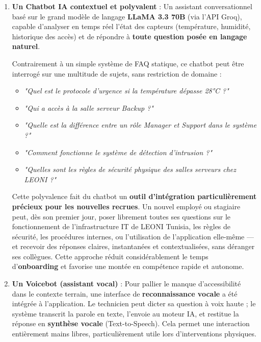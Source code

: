 \documentclass[12pt,a4paper]{report}
\begin{document}
\begin{enumerate}
    \item \textbf{Un Chatbot IA contextuel et polyvalent} : Un assistant conversationnel basé sur le grand modèle de langage \textbf{LLaMA 3.3 70B} (via l'API Groq), capable d'analyser en temps réel l'état des capteurs (température, humidité, historique des accès) et de répondre à \textbf{toute question posée en langage naturel}.

    Contrairement à un simple système de FAQ statique, ce chatbot peut être interrogé sur une multitude de sujets, sans restriction de domaine :
    \begin{itemize}
        \item \textit{"Quel est le protocole d'urgence si la température dépasse 28°C ?"}
        \item \textit{"Qui a accès à la salle serveur Backup ?"}
        \item \textit{"Quelle est la différence entre un rôle Manager et Support dans le système ?"}
        \item \textit{"Comment fonctionne le système de détection d'intrusion ?"}
        \item \textit{"Quelles sont les règles de sécurité physique des salles serveurs chez LEONI ?"}
    \end{itemize}

    Cette polyvalence fait du chatbot un \textbf{outil d'intégration particulièrement précieux pour les nouvelles recrues}. Un nouvel employé ou stagiaire peut, dès son premier jour, poser librement toutes ses questions sur le fonctionnement de l'infrastructure IT de LEONI Tunisia, les règles de sécurité, les procédures internes, ou l'utilisation de l'application elle-même --- et recevoir des réponses claires, instantanées et contextualisées, sans déranger ses collègues. Cette approche réduit considérablement le temps d'\textbf{onboarding} et favorise une montée en compétence rapide et autonome.

    \item \textbf{Un Voicebot (assistant vocal)} : Pour pallier le manque d'accessibilité dans le contexte terrain, une interface de \textbf{reconnaissance vocale} a été intégrée à l'application. Le technicien peut dicter sa question à voix haute ; le système transcrit la parole en texte, l'envoie au moteur IA, et restitue la réponse en \textbf{synthèse vocale} (Text-to-Speech). Cela permet une interaction entièrement mains libres, particulièrement utile lors d'interventions physiques.
\end{enumerate}
\end{document}
